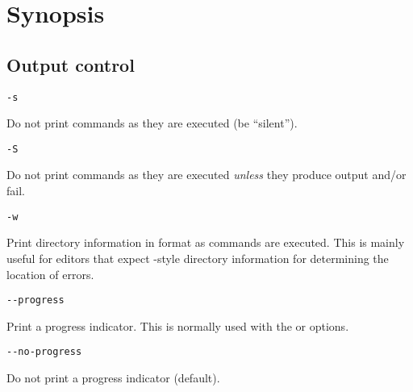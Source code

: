 %
\chapter{Synopsis}
\label{chapter:options}

     
     
     
     

%
\section{Output control}

 \verb+-s+

Do not print commands as they are executed (be ``silent'').

 \verb+-S+

Do not print commands as they are executed \emph{unless} they produce output and/or
fail.

 \verb+-w+

Print directory information in  format as commands are executed.
This is mainly useful for editors that expect -style
directory information for determining the location of errors.

 \verb+--progress+

Print a progress indicator.
This is normally used with the  or  options.

 \verb+--no-progress+

Do not print a progress indicator (default).

